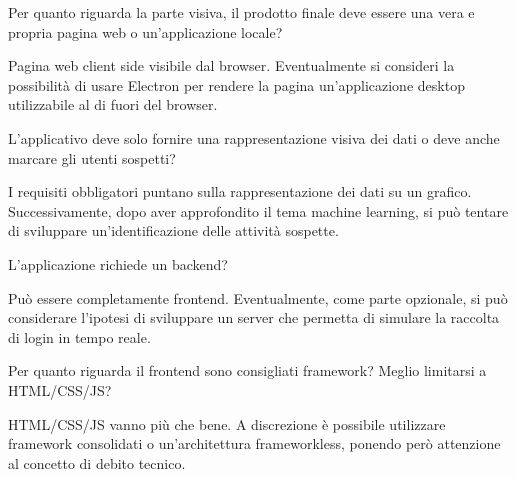 \begin{spacing}{3}
\end{spacing}

\begin{minipage}[c]{0.47\textwidth}
\centering
Per quanto riguarda la parte visiva, il prodotto finale deve essere una vera e propria pagina web o un’applicazione locale?
\end{minipage}
\hfill
\begin{minipage}[c]{0.47\textwidth}
\centering
Pagina web client side visibile dal browser. Eventualmente si consideri la possibilità di usare Electron per rendere la pagina un’applicazione desktop utilizzabile al di fuori del browser.
\end{minipage}

\begin{spacing}{3}
\end{spacing}

\begin{minipage}[c]{0.47\textwidth}
\centering
L’applicativo deve solo fornire una rappresentazione visiva dei dati o deve anche marcare gli utenti sospetti?
\end{minipage}
\hfill
\begin{minipage}[c]{0.47\textwidth}
\centering
I requisiti obbligatori puntano sulla rappresentazione dei dati su un grafico. Successivamente, dopo aver approfondito il tema machine learning, si può tentare di sviluppare un’identificazione delle attività sospette.
\end{minipage}

\begin{spacing}{3}
\end{spacing}

\begin{minipage}[c]{0.47\textwidth}
\centering
L’applicazione richiede un backend?
\end{minipage}
\hfill
\begin{minipage}[c]{0.47\textwidth}
\centering
Può essere completamente frontend. Eventualmente, come parte opzionale, si può considerare l’ipotesi di sviluppare un server che permetta di simulare la raccolta di login in tempo reale.
\end{minipage}

\begin{spacing}{3}
\end{spacing}

\begin{minipage}[c]{0.47\textwidth}
\centering
Per quanto riguarda il frontend sono consigliati framework? Meglio limitarsi a HTML/CSS/JS?
\end{minipage}
\hfill
\begin{minipage}[c]{0.47\textwidth}
\centering
HTML/CSS/JS vanno più che bene. A discrezione è possibile utilizzare framework consolidati o un’architettura frameworkless, ponendo però attenzione al concetto di debito tecnico.
\end{minipage}


